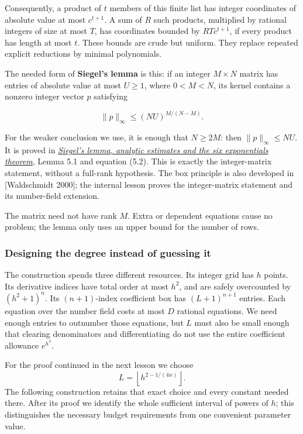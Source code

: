 \documentclass[
  11pt,
  a4paper,
]{article}
\begin{document}
Consequently, a product of \(t\) members of this finite list has integer
coordinates of absolute value at most \(c^{t+1}\). A sum of \(R\) such
products, multiplied by rational integers of size at most \(T\), has
coordinates bounded by \(RTc^{t+1}\), if every product has length at
most \(t\). These bounds are crude but uniform. They replace repeated
explicit reductions by minimal polynomials.

The needed form of \textbf{Siegel's lemma} is this: if an integer
\(M\times N\) matrix has entries of absolute value at most \(U\ge1\),
where \(0<M<N\), its kernel contains a nonzero integer vector \(p\)
satisfying

\[
\|p\|_\infty\le(NU)^{M/(N-M)}.
\]

For the weaker conclusion we use, it is enough that \(N\ge2M\): then
\(\|p\|_\infty\le NU\). It is proved in
\href{https://kokunoyumeto.github.io/open-math-courses-public/courses/TR-TRANS/TR-TRANS-05.html}{\emph{Siegel's lemma, analytic
estimates and the six exponentials theorem}}, Lemma 5.1 and equation
(5.2). This is exactly the integer-matrix statement, without a full-rank
hypothesis. The box principle is also developed in {[}Waldschmidt
2000{]}; the internal lesson proves the integer-matrix statement and its
number-field extension.

The matrix need not have rank \(M\). Extra or dependent equations cause
no problem; the lemma only uses an upper bound for the number of rows.

\subsubsection{Designing the degree instead of guessing
it}\label{designing-the-degree-instead-of-guessing-it}

The construction spends three different resources. Its integer grid has
\(h\) points. Its derivative indices have total order at most \(h^2\),
and are safely overcounted by \((h^2+1)^n\). Its \((n+1)\)-index
coefficient box has \((L+1)^{n+1}\) entries. Each equation over the
number field costs at most \(D\) rational equations. We need enough
entries to outnumber those equations, but \(L\) must also be small
enough that clearing denominators and differentiating do not use the
entire coefficient allowance \(e^{h^3}\).

For the proof continued in the next lesson we choose \[
L=\left\lfloor h^{2-1/(4n)}\right\rfloor.
\] The following construction retains that exact choice and every
constant needed there. After its proof we identify the whole sufficient
interval of powers of \(h\); this distinguishes the necessary budget
requirements from one convenient parameter value.
\end{document}
